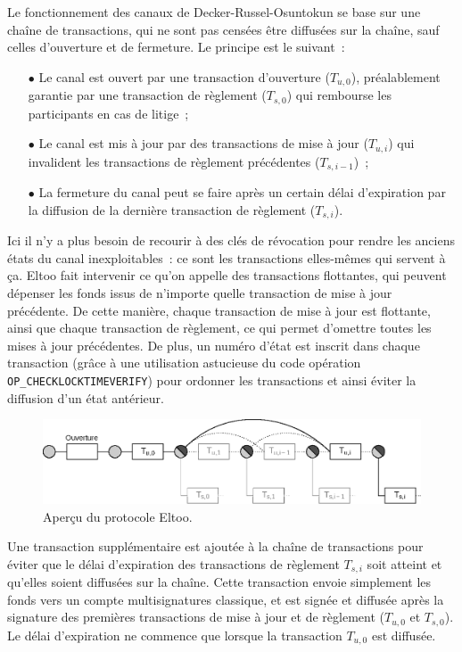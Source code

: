 Le fonctionnement des canaux de Decker-Russel-Osuntokun se base sur une chaîne de transactions, qui ne sont pas censées être diffusées sur la chaîne, sauf celles d'ouverture et de fermeture. Le principe est le suivant~:

\begin{itemize}
\item[$\bullet$] Le canal est ouvert par une transaction d'ouverture ($T_{u,0}$), préalablement garantie par une transaction de règlement ($T_{s,0}$) qui rembourse les participants en cas de litige~;
\item[$\bullet$] Le canal est mis à jour par des transactions de mise à jour ($T_{u,i}$) qui invalident les transactions de règlement précédentes ($T_{s,i-1}$)~;
\item[$\bullet$] La fermeture du canal peut se faire après un certain délai d'expiration par la diffusion de la dernière transaction de règlement ($T_{s,i}$).
\end{itemize}

Ici il n'y a plus besoin de recourir à des clés de révocation pour rendre les anciens états du canal inexploitables~: ce sont les transactions elles-mêmes qui servent à ça. Eltoo fait intervenir ce qu'on appelle des transactions flottantes, qui peuvent dépenser les fonds issus de n'importe quelle transaction de mise à jour précédente. De cette manière, chaque transaction de mise à jour est flottante, ainsi que chaque transaction de règlement, ce qui permet d'omettre toutes les mises à jour précédentes. De plus, un numéro d'état est inscrit dans chaque transaction (grâce à une utilisation astucieuse du code opération \texttt{OP\_CHECKLOCKTIMEVERIFY}) pour ordonner les transactions et ainsi éviter la diffusion d'un état antérieur.

\begin{figure}[h]
  \centering
  \includegraphics[scale=0.7]{img/eltoo-offchain-protocol.eps}
  \caption{Aperçu du protocole Eltoo.}
\end{figure}

Une transaction supplémentaire est ajoutée à la chaîne de transactions pour éviter que le délai d'expiration des transactions de règlement $T_{s,i}$ soit atteint et qu'elles soient diffusées sur la chaîne. Cette transaction envoie simplement les fonds vers un compte multisignatures classique, et est signée et diffusée après la signature des premières transactions de mise à jour et de règlement ($T_{u,0}$ et $T_{s,0}$). Le délai d'expiration ne commence que lorsque la transaction $T_{u,0}$ est diffusée.


